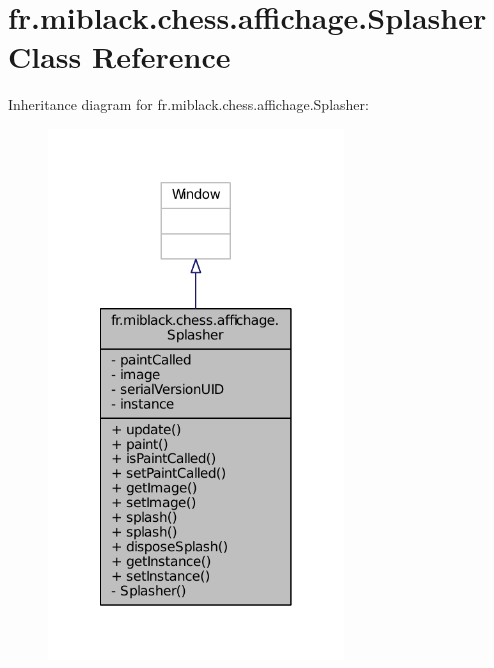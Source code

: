 \section{fr.\-miblack.\-chess.\-affichage.\-Splasher Class Reference}
\label{classfr_1_1miblack_1_1chess_1_1affichage_1_1Splasher}


Inheritance diagram for fr.\-miblack.\-chess.\-affichage.\-Splasher\-:
\nopagebreak
\begin{figure}[H]
\begin{center}
\leavevmode
\includegraphics[width=222pt]{classfr_1_1miblack_1_1chess_1_1affichage_1_1Splasher__inherit__graph}
\end{center}
\end{figure}


